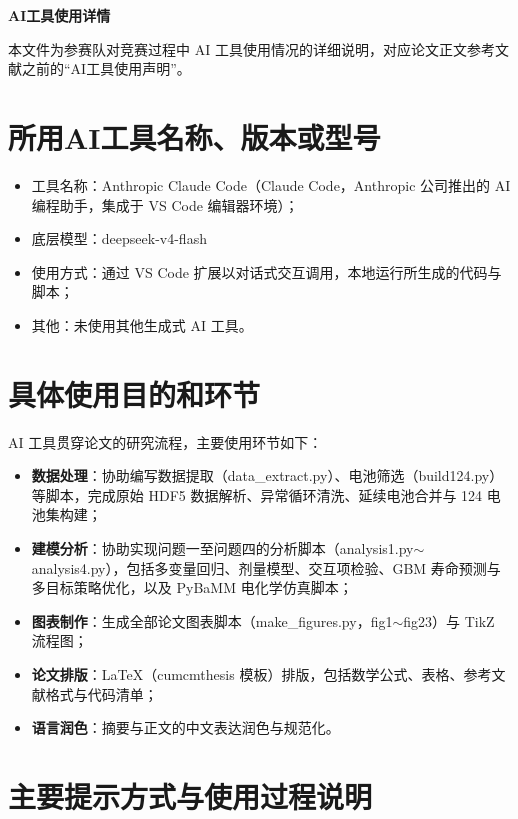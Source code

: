 \documentclass[UTF8]{ctexart}
\newcommand*{\song}{\CJKfamily{song}}
\begin{document}
\begin{center}
{\bfseries\song AI工具使用详情}
\end{center}

本文件为参赛队对竞赛过程中 AI 工具使用情况的详细说明，对应论文正文参考文献之前的“AI工具使用声明”。

\section{所用AI工具名称、版本或型号}

\begin{itemize}[leftmargin=1.6em,itemsep=2pt]
  \item 工具名称：Anthropic Claude Code（Claude Code，Anthropic 公司推出的 AI 编程助手，集成于 VS Code 编辑器环境）；
  \item 底层模型：deepseek-v4-flash
  \item 使用方式：通过 VS Code 扩展以对话式交互调用，本地运行所生成的代码与脚本；
  \item 其他：未使用其他生成式 AI 工具。
\end{itemize}

\section{具体使用目的和环节}

AI 工具贯穿论文的研究流程，主要使用环节如下：

\begin{itemize}[leftmargin=1.6em,itemsep=2pt]
  \item \textbf{数据处理}：协助编写数据提取（data\_extract.py）、电池筛选（build124.py）等脚本，完成原始 HDF5 数据解析、异常循环清洗、延续电池合并与 124 电池集构建；
  \item \textbf{建模分析}：协助实现问题一至问题四的分析脚本（analysis1.py$\sim$analysis4.py），包括多变量回归、剂量模型、交互项检验、GBM 寿命预测与多目标策略优化，以及 PyBaMM 电化学仿真脚本；
  \item \textbf{图表制作}：生成全部论文图表脚本（make\_figures.py，fig1$\sim$fig23）与 TikZ 流程图；
  \item \textbf{论文排版}：LaTeX（cumcmthesis 模板）排版，包括数学公式、表格、参考文献格式与代码清单；
  \item \textbf{语言润色}：摘要与正文的中文表达润色与规范化。
\end{itemize}

\section{主要提示方式与使用过程说明}
\end{document}
